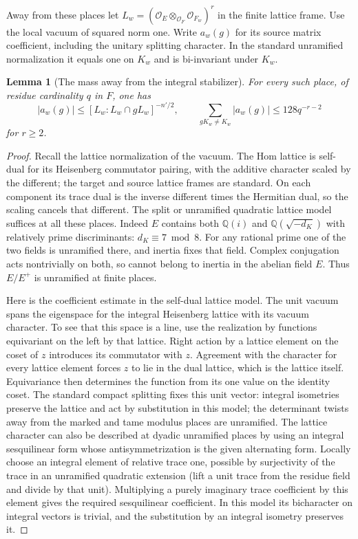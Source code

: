 \documentclass[a4paper,11pt]{article}
\newtheorem{lemma}[proposition]{Lemma}
\theoremstyle{definition}
\theoremstyle{remark}
\numberwithin{equation}{section}
\begin{document}
Away from these places let \(L_w=(\mathcal O_E\otimes_{\mathcal
O_F}\mathcal O_{F_w})^r\) in the finite lattice frame.
Use the local vacuum of squared norm one. Write \(a_w(g)\)
for its source matrix coefficient, including the unitary
splitting character. In the standard unramified normalization
it equals one on \(K_w\) and is bi-invariant under \(K_w\).

\begin{lemma}[The mass away from the integral stabilizer]\leavevmode
\label{lem:vacuumtail709}
For every such place, of residue cardinality \(q\) in \(F\),
one has
\[
   |a_w(g)|\le [L_w:L_w\cap gL_w]^{-n'/2},\qquad
   \sum_{gK_w\ne K_w}|a_w(g)|\le128q^{-r-2}
\]
for \(r\ge2\).
\end{lemma}
\begin{proof}
Recall the lattice normalization of the vacuum. The Hom
lattice is self-dual for its Heisenberg commutator pairing,
with the additive character scaled by the different; the
target and source lattice frames are standard. On each
component its trace dual is the inverse different times the
Hermitian dual, so the scaling cancels that different.
The split or unramified quadratic lattice model suffices
at all these places. Indeed \(E\) contains both \(\mathbb Q(i)\)
and \(\mathbb Q(\sqrt{-d_K})\) with relatively prime
discriminants: \(d_K\equiv7\bmod8\). For any rational
prime one of the two fields is unramified there, and inertia
fixes that field. Complex conjugation acts nontrivially on
both, so cannot belong to inertia in the abelian field
\(E\). Thus \(E/E^+\) is unramified at finite places.

Here is the coefficient estimate in the self-dual lattice
model. The unit vacuum spans the eigenspace for the
integral Heisenberg lattice with its vacuum character. To
see that this space is a line, use the realization by
functions equivariant on the left by that lattice. Right
action by a lattice element on the coset of \(z\) introduces
its commutator with \(z\). Agreement with the character for
every lattice element forces \(z\) to lie in the dual lattice,
which is the lattice itself. Equivariance then determines the
function from its one value on the identity coset. The
standard compact splitting fixes this unit vector: integral
isometries preserve the lattice and act by substitution in
this model; the determinant twists away from the marked and
tame modulus places are unramified. The lattice character can
also be described at dyadic unramified places by using an
integral sesquilinear form whose antisymmetrization is the
given alternating form. Locally choose an integral element
of relative trace one, possible by surjectivity of the trace
in an unramified quadratic extension (lift a unit trace
from the residue field and divide by that unit).
Multiplying a purely imaginary trace coefficient by this
element gives the required sesquilinear coefficient. In this
model its bicharacter on integral vectors is trivial, and
the substitution by an integral isometry preserves it.


\end{proof}
\end{document}
